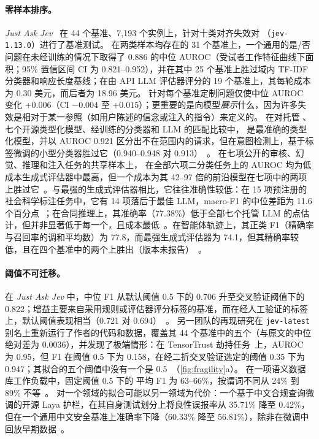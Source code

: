 \paragraph{零样本排序。}
\emph{Just Ask Jev}~\cite{arx29429} 在 44 个基准、7{,}193 个实例上，针对十类对齐失效对 \jev{}（\texttt{jev-1.13.0}）进行了基准测试。
在两类样本均存在的 31 个基准上，一个通用的是/否问题在未经训练的情况下取得了 0.886 的中位 AUROC（受试者工作特征曲线下面积；95\% 置信区间 CI 为 0.821--0.952），并在其中 25 个基准上胜过域内 TF-IDF 分类器和响应长度基线；在由 API LLM 评估器评分的 19 个基准上，其每轮成本为 0.30 美元，而后者为 18.96 美元。
针对每个基准定制问题仅使中位 AUROC 变化 $+0.006$（CI $-0.004$ 至 $+0.015$）；更重要的是向模型\emph{展示}什么，因为许多失效是相对于某一参照（如用户陈述的信念或注入的指令）来定义的。
在对托管 \jev{}、七个开源类型化模型、经训练的分类器和 LLM 的匹配比较中，\jev{} 是最准确的类型化模型，并以 AUROC 0.921 区分出不在范围内的请求，但在意图检测上，基于标签微调的小型分类器胜过它（0.940--0.948 对 0.913）~\cite{arx00346}。
在七项公开的审核、幻觉、推理和注入任务的共享样本上，\jev{} 在全部六项二分类任务上的 AUROC 均为低成本生成式评估器中最高，但一个成本为其 42--97 倍的前沿模型在七项中的两项上胜过它~\cite{zen22885291}\zmark{}。与最强的生成式评估器相比，它往往准确性较低：在 15 项预注册的社会科学标注任务中，它有 14 项落后于最佳 LLM，macro-F1 的中位差距为 11.6 个百分点~\cite{arx24574}；在合同推理上，其准确率（77.38\%）低于全部七个托管 LLM 的点估计，但并非显著低于每一个，且成本最低~\cite{arx27678}。在智能体轨迹上，其正类 F1（精确率与召回率的调和平均数）为 77.8，而最强生成式评估器为 74.1，但其精确率较低，且在四个基准中的两个上胜出（版本未报告）~\cite{arx34862}。

\paragraph{阈值不可迁移。}
在 \emph{Just Ask Jev} 中，中位 F1 从默认阈值 0.5 下的 0.706 升至交叉验证阈值下的 0.822；增益主要来自采用规则或评估器评分标签的基准，而在经人工验证的标签上，默认阈值表现相当（0.721 对 0.694）~\cite{arx29429}。
另一团队的再现研究在 \texttt{jev-latest} 别名上重新运行了作者的代码和数据，覆盖其 44 个基准中的五个（与原文的中位绝对差为 0.0036），并发现了极端情形：在 TensorTrust 劫持任务~\cite{toyer2024tensor}上，AUROC 为 0.95，但 F1 在阈值 0.5 下为 0.158，在经二折交叉验证选定的阈值 0.35 下为 0.947；其拟合的五个阈值中没有一个是 0.5~\cite{jkf87_2026replication}\gmark{}（\cref{fig:fragility}a）。
在一项语义数据库工作负载中，固定阈值 0.5 下的 \jev{} 平均 F1 为 63--66\%，按谓词不同从 24\% 到 89\% 不等~\cite{arx02046}。
对一个领域的拟合可能以另一领域为代价：一个基于中文合规查询微调的开源 Laya 护栏，在其自身测试划分上将良性误报率从 35.71\% 降至 0.42\%，但在一个通用中文安全基准上准确率下降（60.33\% 降至 56.81\%），除非在微调中回放早期数据~\cite{arx33671}。

